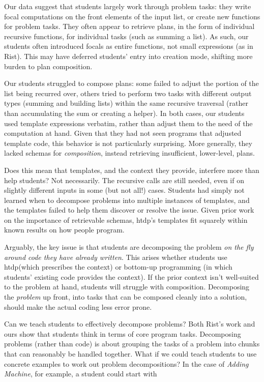 \documentclass{sig-alternate-05-2015}
\newcommand{\htdp}{{\sc htdp}\xspace}
\def\problemName#1{\emph{#1}\xspace}
\def\Adding{\problemName{Adding Machine}}
\begin{document}
Our data suggest that students largely work through problem tasks: they write focal computations on the front elements of the input list, or create new functions for problem tasks.  They often appear to retrieve plans, in the form of individual recursive functions, for individual tasks (such as summing a list).  As such, our students often introduced focals as entire functions, not small expressions (as in Rist).  This may have deferred students' entry into creation mode, shifting more burden to plan composition.

Our students struggled to compose plans: some failed to adjust the portion of the list being recurred over, others tried to perform two tasks with different output types (summing and building lists) within the same recursive traversal (rather than accumulating the sum or creating a helper).  In both cases, our students used template expressions verbatim, rather than adjust them to the need of the computation at hand.  Given that they had not seen programs that adjusted template code, this behavior is not particularly surprising.  More generally, they lacked schemas for \emph{composition}, instead retrieving insufficient, lower-level, plans.

Does this mean that templates, and the context they provide, interfere more than help students?  Not necessarily.  The recursive calls are still needed, even if on slightly different inputs in some (but not all!) cases.  Students had simply not learned when to decompose problems into multiple instances of templates, and the templates failed to help them discover or resolve the issue.  Given prior work on the importance of retrievable schemas, \htdp's templates fit squarely within known results on how people program.  

Arguably, the key issue is that students are decomposing the problem \emph{on the fly around code they have already written}.  This arises whether students use \htdp (which prescribes the context) or bottom-up programming (in which students' existing code provides the context).  If the prior context isn't well-suited to the problem at hand, students will struggle with composition. Decomposing the \emph{problem} up front, into tasks that can be composed cleanly into a solution, should make the actual coding less error prone.  

Can we teach students to effectively decompose problems?  Both Rist's work and ours show that students think in terms of core program tasks.  Decomposing problems (rather than code) is about grouping the tasks of a problem into chunks that can reasonably be handled together.  What if we could teach students to use concrete examples to work out problem decompositions?  In the case of \Adding, for example, a student could start with
\end{document}
